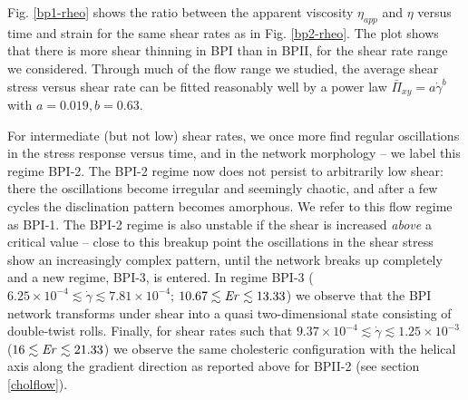 \documentclass[8.5pt,twoside,twocolumn]{article}
\newcommand{\e}[1]{\times10^{#1}}
\newcommand{\gd}{\dot{\gamma}}
\begin{document}
Fig. \ref{bp1-rheo} shows the ratio between the 
apparent viscosity $\eta_{app}$ and $\eta$ versus time and 
strain for the same shear rates as in Fig. \ref{bp2-rheo}. The plot
shows that there is more shear thinning in BPI than in BPII, for
the shear rate range we considered. 
Through much of the flow range we studied,
the average shear stress versus shear rate can be fitted reasonably 
well by a power law $\bar{\Pi}_{xy}=a \gd^b$ with $a=0.019, b=0.63$.

For intermediate (but not low) shear rates, we once more find regular oscillations in the stress
response versus time, and in the network morphology -- we label this 
regime BPI-2. 
The BPI-2 regime now does not persist to arbitrarily low shear: there the
oscillations become irregular and seemingly chaotic, and after a few
cycles the disclination pattern becomes amorphous. We refer to this 
flow regime as BPI-1. 
The BPI-2 regime is also unstable if the shear is increased {\em above} 
a critical value -- close to this breakup point the oscillations in the 
shear stress show an increasingly complex
pattern, until the network breaks up completely and a new regime, BPI-3, is entered.
In regime BPI-3 ($6.25\e{-4}\lesssim\gd\lesssim7.81\e{-4}$; $10.67 \lesssim {\it Er} \lesssim 13.33$) 
we observe that the BPI network transforms under shear into
a  quasi two-dimensional state consisting of
double-twist rolls.
Finally, for shear rates such that
$9.37\e{-4}\lesssim\gd\lesssim1.25\e{-3}$ ($16 \lesssim {\it Er} \lesssim 21.33$) we observe the same cholesteric 
configuration with the helical axis along the gradient direction as 
reported above for BPII-2 (see
section \ref{cholflow}).
 
\end{document}
